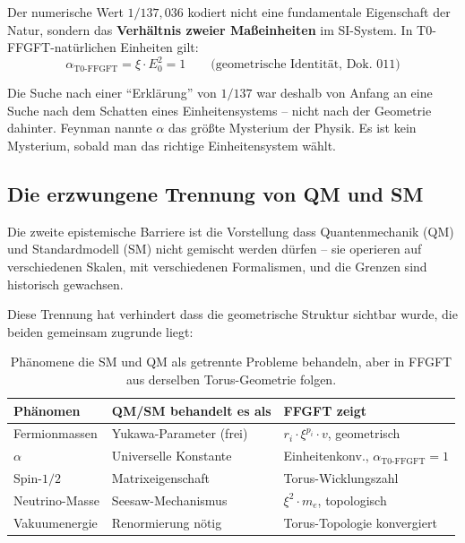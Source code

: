 Der numerische Wert $1/137{,}036$ kodiert nicht eine fundamentale
Eigenschaft der Natur, sondern das \textbf{Verhältnis zweier
Maßeinheiten} im SI-System. In T0-FFGFT-natürlichen Einheiten gilt:
\begin{equation}
    \alpha_{\text{T0-FFGFT}} = \xi \cdot E_0^2 = 1
    \qquad \text{(geometrische Identität, Dok.~011)}
\end{equation}

Die Suche nach einer ``Erklärung'' von $1/137$ war deshalb von
Anfang an eine Suche nach dem Schatten eines Einheitensystems --
nicht nach der Geometrie dahinter. Feynman nannte $\alpha$ das
größte Mysterium der Physik. Es ist kein Mysterium, sobald man
das richtige Einheitensystem wählt.

\subsection{Die erzwungene Trennung von QM und SM}

Die zweite epistemische Barriere ist die Vorstellung dass
Quantenmechanik (QM) und Standardmodell (SM) nicht gemischt
werden dürfen -- sie operieren auf verschiedenen Skalen, mit
verschiedenen Formalismen, und die Grenzen sind historisch
gewachsen.

Diese Trennung hat verhindert dass die geometrische Struktur
sichtbar wurde, die beiden gemeinsam zugrunde liegt:

\begin{table}[htbp]
\centering\footnotesize
\begin{tabular}{lll}
\toprule
\textbf{Phänomen} & \textbf{QM/SM behandelt es als} & \textbf{FFGFT zeigt} \\
\midrule
Fermionmassen & Yukawa-Parameter (frei) & $r_i \cdot \xi^{p_i} \cdot v$, geometrisch \\
$\alpha$ & Universelle Konstante & Einheitenkonv., $\alpha_{\text{T0-FFGFT}}=1$ \\
Spin-$1/2$ & Matrixeigenschaft & Torus-Wicklungszahl \\
Neutrino-Masse & Seesaw-Mechanismus & $\xi^2 \cdot m_e$, topologisch \\
Vakuumenergie & Renormierung nötig & Torus-Topologie konvergiert \\
\bottomrule
\end{tabular}
\caption{Phänomene die SM und QM als getrennte Probleme behandeln,
aber in FFGFT aus derselben Torus-Geometrie folgen.}
\label{tab:sm_qm}
\end{table}

